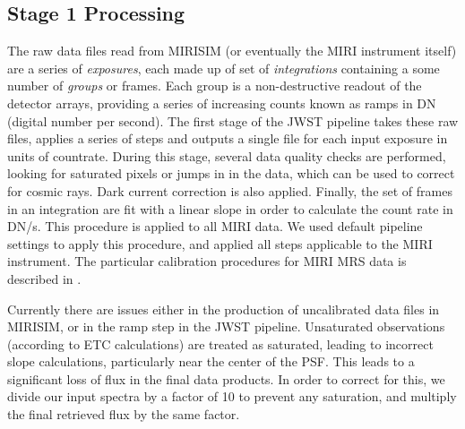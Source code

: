 \subsection{Stage 1 Processing}
The raw data files read from MIRISIM (or eventually the MIRI instrument itself) are a series of \textit{exposures}, each made up of set of \textit{integrations} containing a some number of \textit{groups} or frames.
Each group is a non-destructive readout of the detector arrays, providing a series of increasing counts known as ramps in DN (digital number per second). 
The first stage of the JWST pipeline takes these raw files, applies a series of steps and outputs a single file for each input exposure in units of countrate.
During this stage, several data quality checks are performed, looking for saturated pixels or jumps in in the data, which can be used to correct for cosmic rays.
Dark current correction is also applied.
Finally, the set of frames in an integration are fit with a linear slope in order to calculate the count rate in DN/s.
This procedure is applied to all MIRI data.
We used default pipeline settings to apply this procedure, and applied all steps applicable to the MIRI instrument.
The particular calibration procedures for MIRI MRS data is described in \parencite{ref:mirical}.

Currently there are issues either in the production of uncalibrated data files in MIRISIM, or in the ramp step in the JWST pipeline. 
Unsaturated observations (according to ETC calculations) are treated as saturated, leading to incorrect slope calculations, particularly near the center of the PSF. 
This leads to a significant loss of flux in the final data products.
In order to correct for this, we divide our input spectra by a factor of 10 to prevent any saturation, and multiply the final retrieved flux by the same factor.

